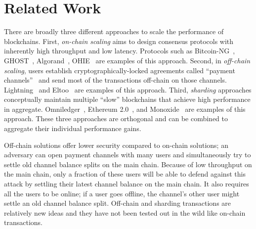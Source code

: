 \chapter{Related Work}
\label{sec:related}
There are broadly three different approaches to scale the performance of blockchains. First, \textit{on-chain scaling} aims to design consensus protocols with inherently high throughput and low  latency. Protocols such as Bitcoin-NG~\cite{bitcoin-ng}, GHOST~\cite{ghost}, Algorand~\cite{algorand}, OHIE~\cite{ohie} are examples of this approach. 
Second, in \textit{off-chain scaling}, users establish cryptographically-locked agreements called ``payment channels''~\cite{payment-channel} and send most of the transactions off-chain on those channels. 
Lightning~\cite{lightning} and Eltoo~\cite{decker2018eltoo} are examples of this approach. 
Third, \textit{sharding} approaches conceptually maintain multiple ``slow'' blockchains that achieve high performance in aggregate. Omniledger~\cite{kokoris2018omniledger}, Ethereum 2.0~\cite{buterin2016ethereum}, and Monoxide~\cite{monoxide} are examples of this approach. 
These three approaches are orthogonal and can be combined to aggregate their individual performance gains. 

Off-chain solutions offer lower security compared to on-chain solutions; an adversary can open payment channels with many users and simultaneously try to settle old channel balance splits
on the main chain. Because of low throughput on the main chain, only a fraction of these users will be able to defend against this attack by settling their latest channel balance on the main chain.
 
It also requires all the users to be online; if a user goes offline, the channel's other user might settle an old channel balance split.
Off-chain and sharding transactions are relatively new ideas and they have not been tested out in the wild like on-chain transactions. 
\fi

